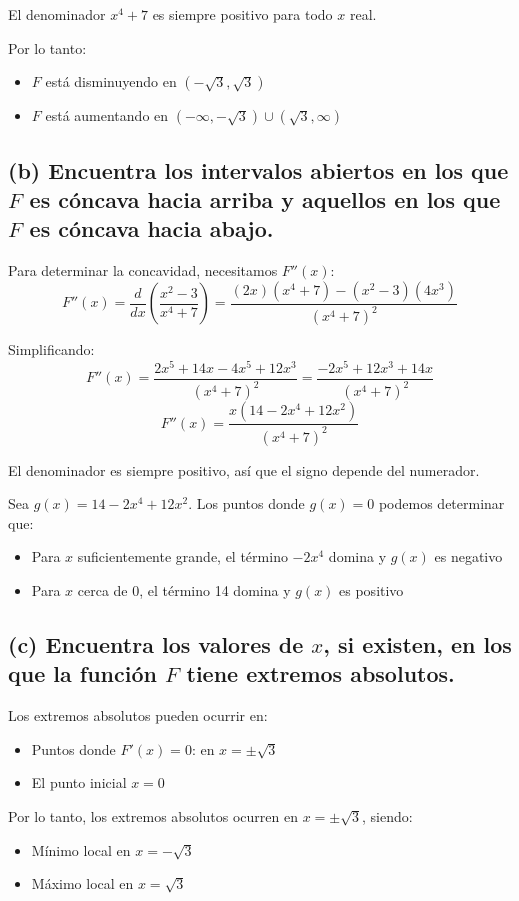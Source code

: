 \documentclass[11pt,letterpaper]{article}
\begin{document}
El denominador $x^4+7$ es siempre positivo para todo $x$ real.

Por lo tanto:
\begin{itemize}
    \item $F$ está disminuyendo en $(-\sqrt{3}, \sqrt{3})$
    \item $F$ está aumentando en $(-\infty, -\sqrt{3}) \cup (\sqrt{3}, \infty)$
\end{itemize}

\subsection*{(b) Encuentra los intervalos abiertos en los que \( F \) es cóncava hacia arriba y aquellos en los que \( F \) es cóncava hacia abajo.}

Para determinar la concavidad, necesitamos $F''(x)$:
\[F''(x) = \frac{d}{dx}\left(\frac{x^2-3}{x^4+7}\right) = \frac{(2x)(x^4+7) - (x^2-3)(4x^3)}{(x^4+7)^2}\]

Simplificando:
\[F''(x) = \frac{2x^5+14x - 4x^5+12x^3}{(x^4+7)^2} = \frac{-2x^5+12x^3+14x}{(x^4+7)^2}\]
\[F''(x) = \frac{x(14-2x^4+12x^2)}{(x^4+7)^2}\]

El denominador es siempre positivo, así que el signo depende del numerador.

Sea $g(x) = 14-2x^4+12x^2$. Los puntos donde $g(x)=0$ podemos determinar que:
\begin{itemize}
    \item Para $x$ suficientemente grande, el término $-2x^4$ domina y $g(x)$ es negativo
    \item Para $x$ cerca de 0, el término 14 domina y $g(x)$ es positivo
\end{itemize}

\subsection*{(c) Encuentra los valores de \( x \), si existen, en los que la función \( F \) tiene extremos absolutos.}

Los extremos absolutos pueden ocurrir en:
\begin{itemize}
    \item Puntos donde $F'(x) = 0$: en $x = \pm\sqrt{3}$
    \item El punto inicial $x = 0$
\end{itemize}

Por lo tanto, los extremos absolutos ocurren en $x = \pm\sqrt{3}$, siendo:
\begin{itemize}
    \item Mínimo local en $x = -\sqrt{3}$
    \item Máximo local en $x = \sqrt{3}$
\end{itemize}
\end{document}
